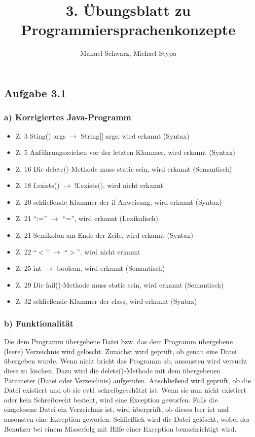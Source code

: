 \documentclass[a4paper, 12pt]{article}
\title{3. Übungsblatt zu Programmiersprachenkonzepte}
\author{Manuel Schwarz, Michael Stypa}
\begin{document}
\maketitle

\subsection*{Aufgabe 3.1}
\subsubsection*{a) Korrigiertes Java-Programm}
\scriptsize
%

\normalsize
\vspace{5mm}

\begin{itemize}
  \item{Z. 3} Sting() args $\rightarrow$ String[] args; wird erkannt (Syntax)
  \item{Z. 5} Anführungszeichen vor der letzten Klammer, wird erkannt (Syntax)
  \item{Z. 16} Die delete()-Methode muss static sein, wird erkannt (Semantisch)
  \item{Z. 18} f.exists() $\rightarrow$ !f.exists(), wird nicht erkannt
  \item{Z. 20} schließende Klammer der if-Anweisung, wird erkannt (Syntax)
  \item{Z. 21} ``:='' $\rightarrow$ ``='', wird erkannt (Lexikalisch)
  \item{Z. 21} Semikolon am Ende der Zeile, wird erkannt (Syntax)
  \item{Z. 22} ``$<$'' $\rightarrow$ ``$>$'', wird nicht erkannt
  \item{Z. 25} int $\rightarrow$ boolean, wird erkannt (Semantisch)
  \item{Z. 29} Die fail()-Methode muss static sein, wird erkannt (Semantisch)
  \item{Z. 32} schließende Klammer der class, wird erkannt (Syntax)
\end{itemize}

\subsubsection*{b) Funktionalität}
Die dem Programm übergebene Datei bzw. das dem Programm übergebene (leere)
Verzeichnis wird gelöscht.
Zunächst wird geprüft, ob genau eine Datei übergeben wurde. Wenn nicht bricht 
das Programm ab, ansonsten wird versucht diese zu löschen.
Dazu wird die delete()-Methode mit dem übergebenen Parameter (Datei oder
Verzeichnis) aufgerufen.
Anschließend wird geprüft, ob die Datei existiert und ob sie evtl.
schreibgeschützt ist. Wenn sie nun nicht existiert oder kein Schreibrecht
besteht, wird eine Exception geworfen.
Falls die eingelesene Datei ein Verzeichnis ist, wird überprüft, ob dieses leer
ist und ansonsten eine Exception geworfen.
Schließlich wird die Datei gelöscht, wobei der Benutzer bei einem Misserfolg
mit Hilfe einer Exception benachrichtigt wird.
\end{document}
